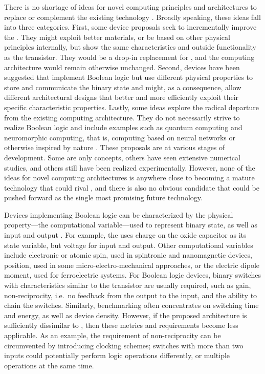 There is no shortage of ideas for novel computing principles and architectures
to replace or complement the existing technology \cite{cavin2012science}
\cite{bernstein2010device}. Broadly speaking, these ideas fall into three
categories. First, some device proposals seek to incrementally improve the
. They might exploit better materials, or be based on other physical
principles internally, but show the same characteristics and outside
functionality as the transistor. They would be a drop-in replacement for
, and the computing architecture would remain otherwise unchanged.
Second, devices have been suggested that implement Boolean logic but use
different physical properties to store and communicate the binary state and
might, as a consequence, allow different architectural designs that better and
more efficiently exploit their specific characteristic properties. Lastly, some
ideas explore the radical departure from the existing computing architecture.
They do not necessarily strive to realize Boolean logic and include examples
such as quantum computing and neuromorphic computing, that is, computing based
on neural networks or otherwise inspired by nature \cite{mead1990neuromorphic}
\cite{schemmel2010wafer} \cite{furber2012overview}. These proposals are at
various stages of development. Some are only concepts, others have seen
extensive numerical studies, and others still have been realized experimentally.
However, none of the ideas for novel computing architectures is anywhere close
to becoming a mature technology that could rival , and there is also no
obvious candidate that could be pushed forward as the single most promising
future technology.

Devices implementing Boolean logic can be characterized by the physical
property---the computational variable---used to represent binary state, as well
as input and output \cite{nikonov2013overview}. For example, the  uses
charge on the oxide capacitor as its state variable, but voltage for input and
output. Other computational variables include electronic or atomic spin, used in
spintronic and nanomagnetic devices, position, used in some
micro-electro-mechanical approaches, or the electric dipole moment, used for
ferroelectric systems. For Boolean logic devices, binary switches with
characteristics similar to the transistor are usually required, such as gain,
non-reciprocity, i.e.~no feedback from the output to the input, and the ability
to chain the switches. Similarly, benchmarking often concentrates on switching
time and energy, as well as device density. However, if the proposed
architecture is sufficiently dissimilar to , then these metrics and
requirements become less applicable. As an example, the requirement of
non-reciprocity can be circumvented by introducing clocking schemes; switches
with more than two inputs could potentially perform logic operations
differently, or multiple operations at the same time.

